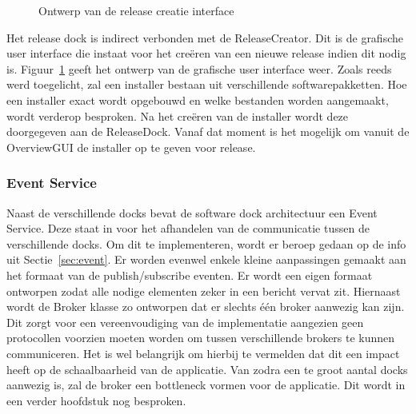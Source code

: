 \begin{figure}[!ht]
\centering
{}
\caption{Ontwerp van de release creatie interface}
\label{fig:releaseCreator}
\end{figure}

Het release dock is indirect verbonden met de ReleaseCreator.
Dit is de grafische user interface die instaat voor het creëren van een nieuwe release indien dit nodig is.
Figuur~\ref{fig:releaseCreator} geeft het ontwerp van de grafische user interface weer.
Zoals reeds werd toegelicht, zal een installer bestaan uit verschillende softwarepakketten.
Hoe een installer exact wordt opgebouwd en welke bestanden worden aangemaakt, wordt verderop besproken.
Na het creëren van de installer wordt deze doorgegeven aan de ReleaseDock.
Vanaf dat moment is het mogelijk om vanuit de OverviewGUI de installer op te geven voor release.

\subsubsection{Event Service}
Naast de verschillende docks bevat de software dock architectuur een Event Service.
Deze staat in voor het afhandelen van de communicatie tussen de verschillende docks.
Om dit te implementeren, wordt er beroep gedaan op de info uit Sectie~\ref{sec:event}.
Er worden evenwel enkele kleine aanpassingen gemaakt aan het formaat van de publish/subscribe eventen.
Er wordt een eigen formaat ontworpen zodat alle nodige elementen zeker in een bericht vervat zit.
Hiernaast wordt de Broker klasse zo ontworpen dat er slechts één broker aanwezig kan zijn.
Dit zorgt voor een vereenvoudiging van de implementatie aangezien geen protocollen voorzien moeten worden om tussen verschillende brokers te kunnen communiceren.
Het is wel belangrijk om hierbij te vermelden dat dit een impact heeft op de schaalbaarheid van de applicatie.
Van zodra een te groot aantal docks aanwezig is, zal de broker een bottleneck vormen voor de applicatie.
Dit wordt in een verder hoofdstuk nog besproken.


